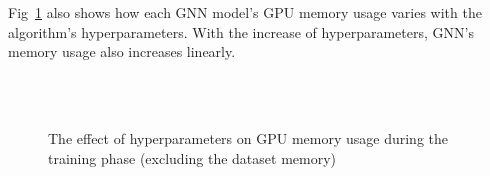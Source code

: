 Fig~\ref{fig:exp_hyperparameter_memory_usage} also shows how each GNN model's GPU memory usage varies with the algorithm's hyperparameters.
With the increase of hyperparameters, GNN's memory usage also increases linearly.

\begin{figure}
	\centering
    \\
    \\
    \caption{The effect of hyperparameters on GPU memory usage during the training phase (excluding the dataset memory)}
	\label{fig:exp_hyperparameter_memory_usage}
\end{figure}

